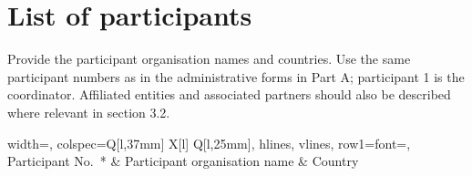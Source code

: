 \section*{List of participants}
\begin{heguidance}
Provide the participant organisation names and countries. Use the same participant
numbers as in the administrative forms in Part A; participant 1 is the coordinator.
Affiliated entities and associated partners should also be described where relevant
in section 3.2.
\end{heguidance}
\noindent
\begin{tblr}[expand=\HEParticipants]{
  width=\linewidth,
  colspec={Q[l,37mm] X[l] Q[l,25mm]},
  hlines, vlines,
  row{1}={font=\bfseries},
}
Participant No.\ * & Participant organisation name & Country \\
\HEParticipants
\end{tblr}

